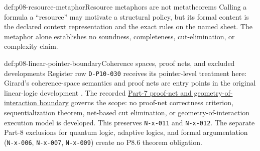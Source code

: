 
\begin{hbwarning}{def:p08-resource-metaphor}{Resource metaphors are not metatheorems}
Calling a formula a ``resource'' may motivate a structural policy, but its
formal content is the declared context representation and the exact rules on
the named sheet.  The metaphor alone establishes no soundness, completeness,
cut-elimination, or complexity claim.
\end{hbwarning}


\begin{proofboundary}{def:p08-linear-pointer-boundary}{Coherence spaces, proof nets, and excluded developments}
Register row \texttt{D-P10-030} receives its pointer-level treatment here:
Girard's coherence-space semantics and proof nets are entry points in the
original linear-logic development \cite{Girard1987}.  The recorded
\hyperref[def:p07-proof-nets-goi-boundary]{Part-7 proof-net and geometry-of-interaction
boundary} governs the scope: no proof-net correctness criterion,
sequentialization theorem, net-based cut elimination, or
geometry-of-interaction execution model is developed.  This preserves
\texttt{N-x-011} and \texttt{N-x-012}.  The separate Part-8 exclusions for
quantum logic, adaptive logics, and formal argumentation
(\texttt{N-x-006}, \texttt{N-x-007}, \texttt{N-x-009}) create no P8.6
theorem obligation.
\end{proofboundary}
